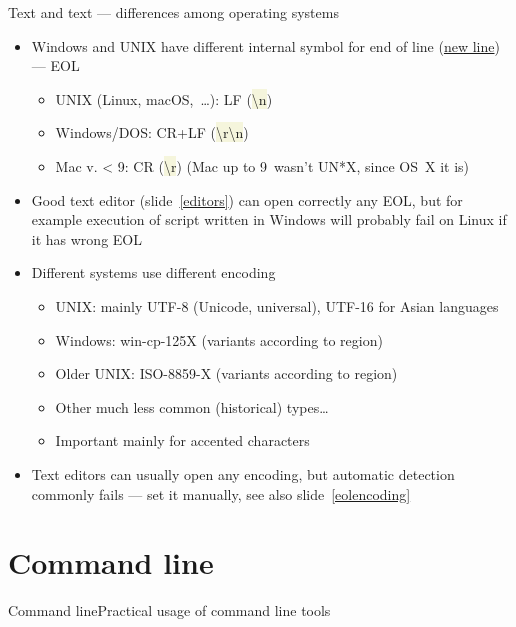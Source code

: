 \documentclass[compress, ucs, xelatex, 11pt, xcolor=svgnames, aspectratio=169,
	hyperref={
		bookmarks=true,
		unicode=true,
		colorlinks=true,
		pdftitle={Linux, command line and MetaCentrum},
		plainpages=false,
		pdfauthor={Vojtech Zeisek},
		pdfsubject={Course about use of Linux command line, writing shell scripts and using MetaCentrum of CESNET},
		pdfcreator={XeLaTeX},
		pdfkeywords={Linux, GNU, BASH, shell, command line, MetaCentrum},
		linkcolor=DarkRed, %
		anchorcolor=DarkBlue, %
		citecolor=Indigo, %
		filecolor=NavyBlue, %
		menucolor=DarkMagenta, %
		urlcolor=DarkBlue, %
		pdftex},
	url={hyphens, lowtilde} %
	]{beamer}
\renewcommand{\texttt}[1]{\colorbox{Beige}{{\ttfamily #1}}}
\begin{document}
\begin{frame}{Text and text --- differences among operating systems}
	\label{eolenc}
	\begin{itemize}
		\item Windows and UNIX have different internal symbol for end of line (\href{https://en.wikipedia.org/wiki/Newline}{new line}) --- EOL
		\begin{itemize}
			\item UNIX (Linux, macOS,~\ldots): LF (\texttt{\textbackslash n})
			\item Windows/DOS: CR+LF (\texttt{\textbackslash r\textbackslash n})
			\item Mac v. < 9: CR (\texttt{\textbackslash r}) (Mac up to 9~wasn't UN*X, since OS~X it is)
		\end{itemize}
		\item Good text editor (slide~\ref{editors}) can open correctly any EOL, but for example execution of script written in Windows will probably fail on Linux if it has wrong EOL
		\item Different systems use different encoding
		\begin{itemize}
			\item UNIX: mainly UTF-8 (Unicode, universal), UTF-16 for Asian languages
			\item Windows: win-cp-125X (variants according to region)
			\item Older UNIX: ISO-8859-X (variants according to region)
			\item Other much less common (historical) types\ldots
			\item Important mainly for accented characters
		\end{itemize}
		\item Text editors can usually open any encoding, but automatic detection commonly fails --- set it manually, see also slide~\ref{eolencoding}
	\end{itemize}
\end{frame}

\section{Command line}

\begin{frame}[allowframebreaks]{Command line}{Practical usage of command line tools}
	\tableofcontents[currentsection, sectionstyle=show/hide, hideothersubsections]
\end{frame}
\end{document}
